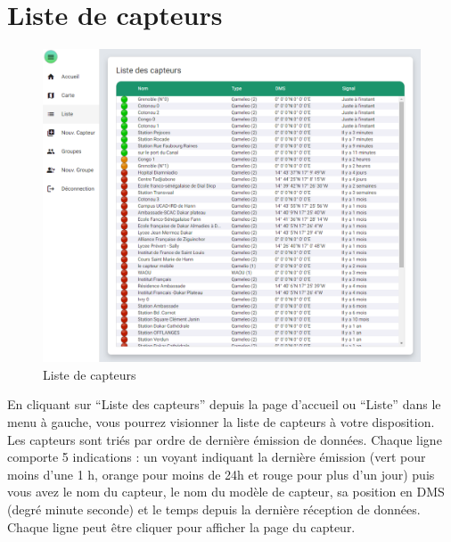 \section{Liste de capteurs}\label{sec:liste-de-capteurs}

    \begin{figure}[H]
        \begin{center}
            \includegraphics[width=12cm]{resources/list}
        \end{center}
        \caption{Liste de capteurs}\label{fig:liste-de-capteurs}
    \end{figure}

    En cliquant sur ``Liste des capteurs'' depuis la page d'accueil ou ``Liste'' dans le menu à gauche,
    vous pourrez visionner la liste de capteurs à votre disposition.
    Les capteurs sont triés par ordre de dernière émission de données.
    Chaque ligne comporte 5 indications : un voyant indiquant la dernière émission (vert pour moins d'une 1 h,
    orange pour moins de 24h et rouge pour plus d'un jour) puis vous avez le nom du capteur,
    le nom du modèle de capteur, sa position en DMS (degré minute seconde)
    et le temps depuis la dernière réception de données.
    Chaque ligne peut être cliquer pour afficher la page du capteur.
